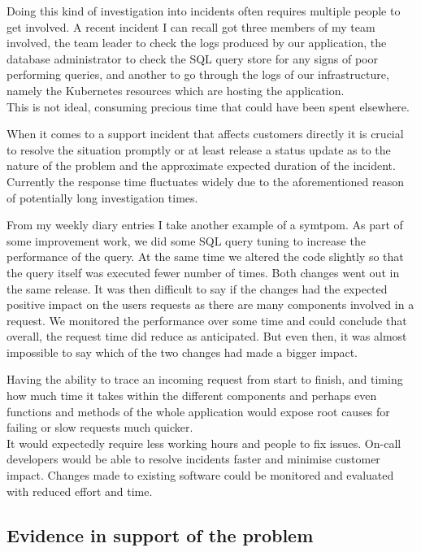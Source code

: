 \documentclass[11pt]{article}
\begin{document}
Doing this kind of investigation into incidents often requires multiple people to get involved. A recent incident I can recall got three members of my team involved, the team leader to check the logs produced by our application, the database administrator to check the SQL query store for any signs of poor performing queries, and another to go through the logs of our infrastructure, namely the Kubernetes resources which are hosting the application.\\
This is not ideal, consuming precious time that could have been spent elsewhere.

When it comes to a support incident that affects customers directly it is crucial to resolve the situation promptly or at least release a status update as to the nature of the problem and the approximate expected duration of the incident. Currently the response time fluctuates widely due to the aforementioned reason of potentially long investigation times.

From my weekly diary entries I take another example of a symtpom. As part of some improvement work, we did some SQL query tuning to increase the performance of the query. At the same time we altered the code slightly so that the query itself was executed fewer number of times. Both changes went out in the same release. It was then difficult to say if the changes had the expected positive impact on the users requests as there are many components involved in a request. We monitored the performance over some time and could conclude that overall, the request time did reduce as anticipated. But even then, it was almost impossible to say which of the two changes had made a bigger impact.

Having the ability to trace an incoming request from start to finish, and timing how much time it takes within the different components and perhaps even functions and methods of the whole application would expose root causes for failing or slow requests much quicker.\\
It would expectedly require less working hours and people to fix issues. On-call developers would be able to resolve incidents faster and minimise customer impact. Changes made to existing software could be monitored and evaluated with reduced effort and time.

\subsection{Evidence in support of the problem}
\end{document}
